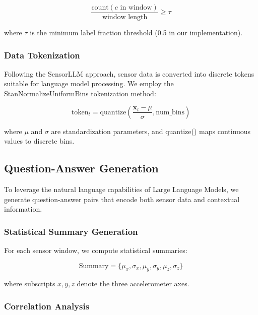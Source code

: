 \begin{equation}
\frac{\text{count}(c \text{ in window})}{\text{window length}} \geq \tau
\end{equation}

where $\tau$ is the minimum label fraction threshold (0.5 in our implementation).

\subsubsection{Data Tokenization}

\hspace{2em}Following the SensorLLM approach, sensor data is converted into discrete tokens suitable for language model processing. We employ the StanNormalizeUniformBins tokenization method:

\begin{equation}
\text{token}_t = \text{quantize}\left(\frac{\mathbf{x}_t - \mu}{\sigma}, \text{num\_bins}\right)
\end{equation}

where $\mu$ and $\sigma$ are standardization parameters, and quantize() maps continuous values to discrete bins.

\subsection{Question-Answer Generation}

\hspace{2em}To leverage the natural language capabilities of Large Language Models, we generate question-answer pairs that encode both sensor data and contextual information.

\subsubsection{Statistical Summary Generation}

\hspace{2em}For each sensor window, we compute statistical summaries:

\begin{equation}
\text{Summary} = \{\mu_x, \sigma_x, \mu_y, \sigma_y, \mu_z, \sigma_z\}
\end{equation}

where subscripts $x, y, z$ denote the three accelerometer axes.

\subsubsection{Correlation Analysis}

